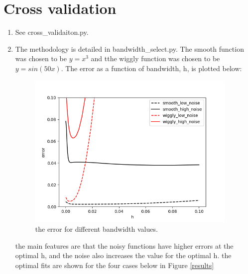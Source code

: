 \documentclass[10pt]{article}
\begin{document}
    \section*{Cross validation}
    \begin{enumerate}[label=(\Alph*)]
    \item
    See cross\_validaiton.py.
    \item
    The methodology is detailed in bandwidth\_select.py. The smooth function was chosen to be $y=x^3$ and tthe wiggly function was chosen to be $y=sin(50x)$. The error as a function of bandwidth, h, is plotted below:

    \begin{figure}[htb] \centering
    \includegraphics[width=0.95\textwidth]{./h_select.png}
    \caption{the error for different bandwidth values.}
    \label{fig:h_select}
    \end{figure}

    the main features are that the noisy functions have higher errors at the optimal h, and the noise also increases the value for the optimal h. the optimal fits are shown for the four cases below in Figure \ref{results}


\end{enumerate}
\end{document}

